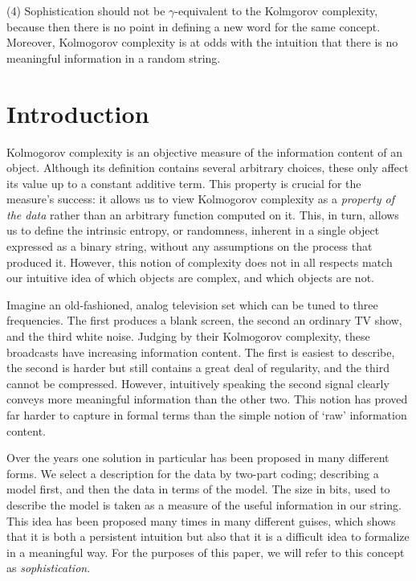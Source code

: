 \documentclass{style/llncs}
\begin{document}
(4) Sophistication should not be $\gamma$-equivalent to the Kolmgorov complexity, because then there is no point in defining a new word for the same concept. Moreover, Kolmogorov complexity is at odds with the intuition that there is no meaningful information in a random string.

\section{Introduction}

\noindent Kolmogorov complexity is an objective measure of the information content of an object. Although its definition contains several arbitrary choices, these only affect its value up to a constant additive term. This property is crucial for the measure's success: it allows us to view Kolmogorov complexity as a \emph{property of the data} rather than an arbitrary function computed on it. This, in turn, allows us to define the intrinsic entropy, or randomness, inherent in a single object expressed as a binary string, without any assumptions on the process that produced it. However, this notion of complexity does not in all respects match our intuitive idea of which objects are complex, and which objects are not.

Imagine an old-fashioned, analog television set which can be tuned to three frequencies. The first produces a blank screen, the second an ordinary TV show, and the third white noise. Judging by their Kolmogorov complexity, these  broadcasts have increasing information content. The first is easiest to describe, the second is harder but still contains a great deal of regularity, and the third cannot be compressed. However, intuitively speaking the second signal clearly conveys more meaningful information than the other two. This notion has proved far harder to capture in formal terms than the simple notion of `raw' information content. 

Over the years one solution in particular has been proposed in many different forms. We select a description for the data by two-part coding; describing a model first, and then the data in terms of the model. The size in bits, used to describe the model is taken as a measure of the useful information in our string. This idea has been proposed many times in many different guises, which shows that it is both a persistent intuition but also that it is a difficult idea to formalize in a meaningful way. For the purposes of this paper, we will refer to this concept as \emph{sophistication}\footnotemark. 
\end{document}
